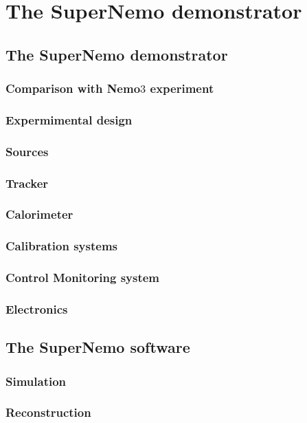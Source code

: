 \chapter{The SuperNemo demonstrator}
\label{ch:detector}

\section{The SuperNemo demonstrator}
\subsection{Comparison with Nemo$3$ experiment}
\subsection{Expermimental design}
\subsection{Sources}
\subsection{Tracker}
\subsection{Calorimeter}
\label{sec:calorimeter}
\subsection{Calibration systems}
\subsection{Control Monitoring system}
\subsection{Electronics}

\section{The SuperNemo software}
\label{sec:SNsoftware}
\subsection{Simulation}
\subsection{Reconstruction}
